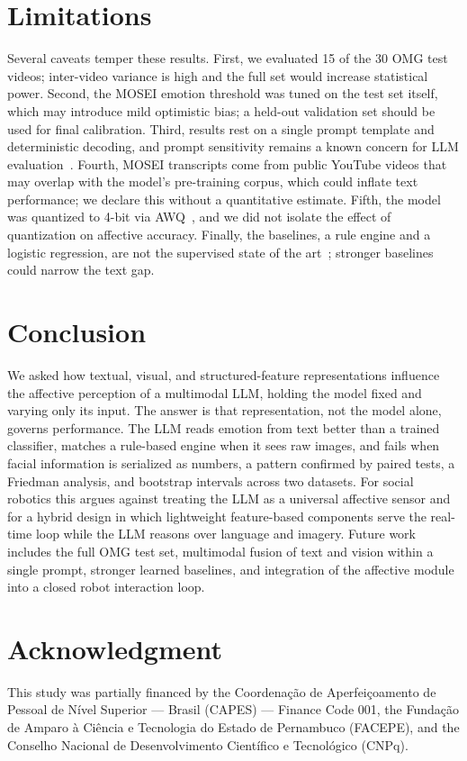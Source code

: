 \documentclass[conference]{IEEEtran}
\begin{document}
\section{Limitations}
\label{sec:limitations}
Several caveats temper these results. First, we evaluated 15 of the 30 OMG test videos; inter-video variance is high and the full set would increase statistical power. Second, the MOSEI emotion threshold was tuned on the test set itself, which may introduce mild optimistic bias; a held-out validation set should be used for final calibration. Third, results rest on a single prompt template and deterministic decoding, and prompt sensitivity remains a known concern for LLM evaluation~\cite{Zhang2025FluentUnfeeling}. Fourth, MOSEI transcripts come from public YouTube videos that may overlap with the model's pre-training corpus, which could inflate text performance; we declare this without a quantitative estimate. Fifth, the model was quantized to 4-bit via AWQ~\cite{Lin2024AWQ}, and we did not isolate the effect of quantization on affective accuracy. Finally, the baselines, a rule engine and a logistic regression, are not the supervised state of the art~\cite{Li2022DeepFER}; stronger baselines could narrow the text gap.

\section{Conclusion}
\label{sec:conclusion}
We asked how textual, visual, and structured-feature representations influence the affective perception of a multimodal LLM, holding the model fixed and varying only its input. The answer is that representation, not the model alone, governs performance. The LLM reads emotion from text better than a trained classifier, matches a rule-based engine when it sees raw images, and fails when facial information is serialized as numbers, a pattern confirmed by paired tests, a Friedman analysis, and bootstrap intervals across two datasets. For social robotics this argues against treating the LLM as a universal affective sensor and for a hybrid design in which lightweight feature-based components serve the real-time loop while the LLM reasons over language and imagery. Future work includes the full OMG test set, multimodal fusion of text and vision within a single prompt, stronger learned baselines, and integration of the affective module into a closed robot interaction loop.

\section*{Acknowledgment}
This study was partially financed by the Coordena\c{c}\~ao de Aperfei\c{c}oamento de Pessoal de N\'ivel Superior --- Brasil (CAPES) --- Finance Code 001, the Funda\c{c}\~ao de Amparo \`a Ci\^encia e Tecnologia do Estado de Pernambuco (FACEPE), and the Conselho Nacional de Desenvolvimento Cient\'ifico e Tecnol\'ogico (CNPq).



\end{document}
